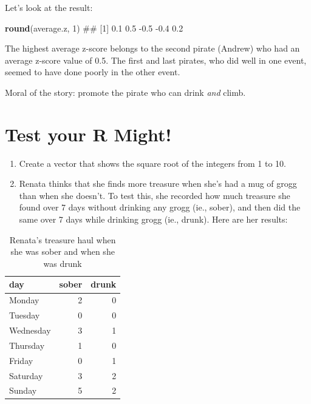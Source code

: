 \documentclass[]{book}
\newenvironment{Shaded}{\begin{snugshade}}{\end{snugshade}}
\newcommand{\KeywordTok}[1]{\textcolor[rgb]{0.13,0.29,0.53}{\textbf{#1}}}
\newcommand{\DecValTok}[1]{\textcolor[rgb]{0.00,0.00,0.81}{#1}}
\newcommand{\NormalTok}[1]{#1}
\theoremstyle{definition}
\theoremstyle{definition}
\theoremstyle{remark}
\begin{document}
Let's look at the result:

\begin{Shaded}
\begin{Highlighting}[]
\KeywordTok{round}\NormalTok{(average.z, }\DecValTok{1}\NormalTok{)}
\NormalTok{## [1]  0.1  0.5 -0.5 -0.4  0.2}
\end{Highlighting}
\end{Shaded}

The highest average z-score belongs to the second pirate (Andrew) who
had an average z-score value of 0.5. The first and last pirates, who did
well in one event, seemed to have done poorly in the other event.

Moral of the story: promote the pirate who can drink \emph{and} climb.

\section{Test your R Might!}\label{test-your-r-might-2}

\begin{enumerate}
\def\labelenumi{\arabic{enumi}.}
\item
  Create a vector that shows the square root of the integers from 1 to
  10.
\item
  Renata thinks that she finds more treasure when she's had a mug of
  grogg than when she doesn't. To test this, she recorded how much
  treasure she found over 7 days without drinking any grogg (ie.,
  sober), and then did the same over 7 days while drinking grogg (ie.,
  drunk). Here are her results:
\end{enumerate}

\begin{table}

\caption{\label{tab:unnamed-chunk-143}Renata's treasure haul when she was sober and when she was drunk}
\centering
\begin{tabular}[t]{l|r|r}
\hline
day & sober & drunk\\
\hline
Monday & 2 & 0\\
\hline
Tuesday & 0 & 0\\
\hline
Wednesday & 3 & 1\\
\hline
Thursday & 1 & 0\\
\hline
Friday & 0 & 1\\
\hline
Saturday & 3 & 2\\
\hline
Sunday & 5 & 2\\
\hline
\end{tabular}
\end{table}
\end{document}
